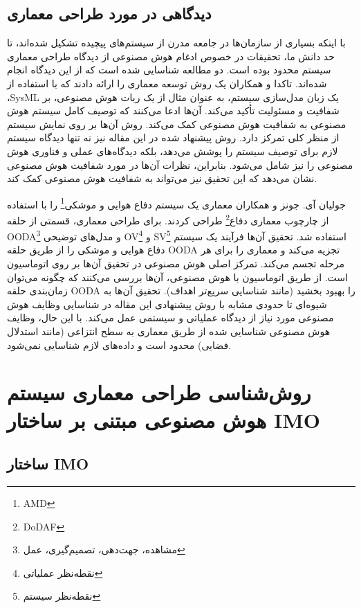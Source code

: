 \documentclass[a4paper,10pt]{article}
\begin{document}
        \subsection{دیدگاهی در مورد طراحی معماری}

            با اینکه بسیاری از سازمان‌ها در جامعه مدرن از سیستم‌های پیچیده تشکیل شده‌اند، تا حد دانش ما، تحقیقات در خصوص ادغام هوش مصنوعی از دیدگاه طراحی معماری سیستم محدود بوده است. دو مطالعه شناسایی شده است که از این دیدگاه انجام شده‌اند. تاکدا و همکاران یک روش توسعه معماری را ارائه دادند که با استفاده از ،SysML یک زبان مدل‌سازی سیستم، به عنوان مثال از یک ربات هوش مصنوعی، بر شفافیت و مسئولیت تأکید می‌کند. آن‌ها ادعا می‌کنند که توصیف کامل سیستم هوش مصنوعی به شفافیت هوش مصنوعی کمک می‌کند. روش آن‌ها بر روی نمایش سیستم از منظر کلی تمرکز دارد. روش پیشنهاد شده در این مقاله نیز نه تنها دیدگاه سیستم لازم برای توصیف سیستم را پوشش می‌دهد، بلکه دیدگاه‌های عملی و فناوری هوش مصنوعی را نیز شامل می‌شود. بنابراین، نظرات آن‌ها در مورد شفافیت هوش مصنوعی نشان می‌دهد که این تحقیق نیز می‌تواند به شفافیت هوش مصنوعی کمک کند.

            جولیان آی. جونز و همکاران معماری یک سیستم دفاع هوایی و موشکی\footnote{\hspace{2pt}AMD} را با استفاده از چارچوب معماری دفاع\footnote{\hspace{2pt}DoDAF} طراحی کردند. برای طراحی معماری، قسمتی از حلقه OODA\footnote{\hspace{2pt}مشاهده، جهت‌دهی، تصمیم‌گیری، عمل} و مدل‌های توضیحی OV\footnote{\hspace{2pt}نقطه‌نظر عملیاتی} و SV\footnote{\hspace{2pt}نقطه‌نظر سیستم} استفاده شد. تحقیق آن‌ها فرآیند یک سیستم دفاع هوایی و موشکی را از طریق حلقه OODA تجزیه می‌کند و معماری را برای هر مرحله تجسم می‌کند. تمرکز اصلی هوش مصنوعی در تحقیق آن‌ها بر روی اتوماسیون است. از طریق اتوماسیون با هوش مصنوعی، آن‌ها بررسی می‌کنند که چگونه می‌توان زمان‌بندی حلقه OODA را بهبود بخشید (مانند شناسایی سریع‌تر اهداف). تحقیق آن‌ها به شیوه‌ای تا حدودی مشابه با روش پیشنهادی این مقاله در شناسایی وظایف هوش مصنوعی مورد نیاز از دیدگاه عملیاتی و سیستمی عمل می‌کند. با این حال، وظایف هوش مصنوعی شناسایی شده از طریق معماری به سطح انتزاعی (مانند استدلال فضایی) محدود است و داده‌های لازم شناسایی نمی‌شود.

    \section{روش‌شناسی طراحی معماری سیستم هوش مصنوعی مبتنی بر ساختار IMO}

        \subsection{ساختار IMO}
\end{document}
